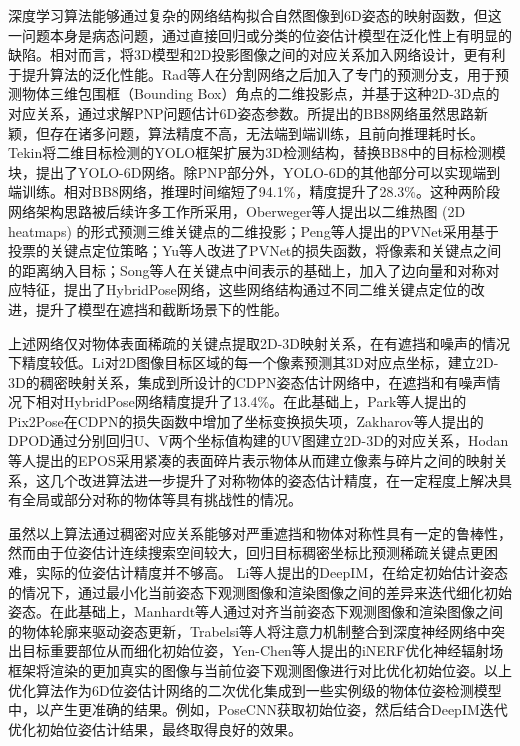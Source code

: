 \documentclass[12pt]{article}
\begin{document}
深度学习算法能够通过复杂的网络结构拟合自然图像到6D姿态的映射函数，但这一问题本身是病态问题，通过直接回归或分类的位姿估计模型在泛化性上有明显的缺陷。相对而言，将3D模型和2D投影图像之间的对应关系加入网络设计，更有利于提升算法的泛化性能。Rad等人\cite{rad2017bb8}在分割网络之后加入了专门的预测分支，用于预测物体三维包围框（Bounding Box）角点的二维投影点，并基于这种2D-3D点的对应关系，通过求解PNP问题估计6D姿态参数。所提出的BB8网络\cite{rad2017bb8}虽然思路新颖，但存在诸多问题，算法精度不高，无法端到端训练，且前向推理耗时长。Tekin将二维目标检测的YOLO\cite{redmon2016yolo}框架扩展为3D检测结构，替换BB8中的目标检测模块，提出了YOLO-6D网络。除PNP部分外，YOLO-6D的其他部分可以实现端到端训练。相对BB8网络，推理时间缩短了94.1\%，精度提升了28.3\%。这种两阶段网络架构思路被后续许多工作所采用，Oberweger等人\cite{oberweger2018}提出以二维热图 (2D heatmaps) 的形式预测三维关键点的二维投影；Peng等人\cite{peng2019pvnet}提出的PVNet采用基于投票的关键点定位策略；Yu等人\cite{yu20206dof}改进了PVNet的损失函数，将像素和关键点之间的距离纳入目标；Song等人在关键点中间表示的基础上，加入了边向量和对称对应特征，提出了HybridPose\cite{song2020hybridpose}网络，这些网络结构通过不同二维关键点定位的改进，提升了模型在遮挡和截断场景下的性能。

上述网络仅对物体表面稀疏的关键点提取2D-3D映射关系，在有遮挡和噪声的情况下精度较低。Li对2D图像目标区域的每一个像素预测其3D对应点坐标，建立2D-3D的稠密映射关系，集成到所设计的CDPN\cite{li2019cdpn}姿态估计网络中，在遮挡和有噪声情况下相对HybridPose网络精度提升了13.4\%。在此基础上，Park等人提出的Pix2Pose\cite{park2019pix2pose}在CDPN的损失函数中增加了坐标变换损失项，Zakharov等人提出的DPOD\cite{zakharov2019dpod}通过分别回归U、V两个坐标值构建的UV图建立2D-3D的对应关系，Hodan等人提出的EPOS\cite{hodan2020epos}采用紧凑的表面碎片表示物体从而建立像素与碎片之间的映射关系，这几个改进算法进一步提升了对称物体的姿态估计精度，在一定程度上解决具有全局或部分对称的物体等具有挑战性的情况。

虽然以上算法通过稠密对应关系能够对严重遮挡和物体对称性具有一定的鲁棒性，然而由于位姿估计连续搜索空间较大，回归目标稠密坐标比预测稀疏关键点更困难，实际的位姿估计精度并不够高。
Li等人提出的DeepIM\cite{li2018deepim}，在给定初始估计姿态的情况下，通过最小化当前姿态下观测图像和渲染图像之间的差异来迭代细化初始姿态。在此基础上，Manhardt等人\cite{manhardt2018deep}通过对齐当前姿态下观测图像和渲染图像之间的物体轮廓来驱动姿态更新，Trabelsi等人\cite{trabelsi2021pose}将注意力机制整合到深度神经网络中突出目标重要部位从而细化初始位姿，Yen-Chen等人\cite{yen2021inerf}提出的iNERF优化神经辐射场框架将渲染的更加真实的图像与当前位姿下观测图像进行对比优化初始位姿。以上优化算法作为6D位姿估计网络的二次优化集成到一些实例级的物体位姿检测模型中，以产生更准确的结果。例如，PoseCNN\cite{Xiang2018}获取初始位姿，然后结合DeepIM\cite{li2018deepim}迭代优化初始位姿估计结果，最终取得良好的效果。
\end{document}
